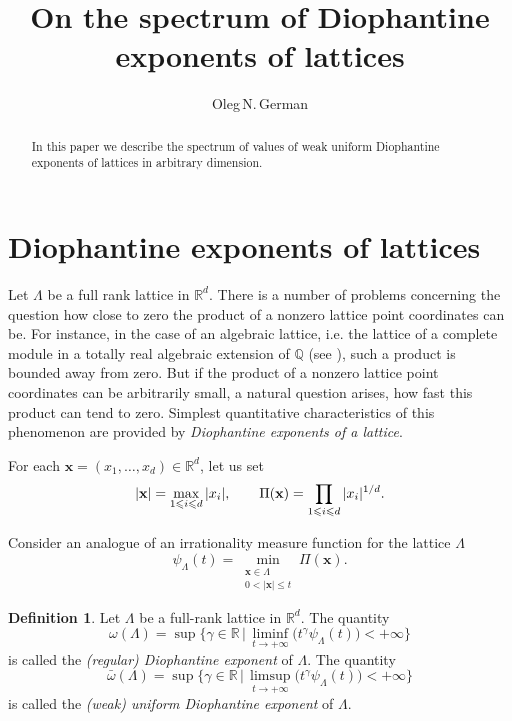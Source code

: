 \documentclass[a4paper,12pt]{article}
\title{On the spectrum of Diophantine exponents of lattices}
\author{Oleg\,N.\,German}
\date{}
\theoremstyle{definition}
\newtheorem{definition}{Definition}
\theoremstyle{remark}
\theoremstyle{plain}
\renewcommand{\vec}[1]{\mathbf{#1}}
\renewcommand{\leq}{\leqslant}
\newcommand{\R}{\mathbb{R}}
\newcommand{\Q}{\mathbb{Q}}
\newcommand{\La}{\Lambda}
\begin{document}
\maketitle

\begin{abstract}
  In this paper we describe the spectrum of values of weak uniform Diophantine exponents of lattices in arbitrary dimension.
\end{abstract}


\section{Diophantine exponents of lattices}


Let $\La$ be a full rank lattice in $\R^d$. There is a number of problems concerning the question how close to zero the product of a nonzero lattice point coordinates can be. For instance, in the case of an algebraic lattice, i.e. the lattice of a complete module in a totally real algebraic extension of $\Q$ (see \cite{borevich_shafarevich}), such a product is bounded away from zero. But if the product of a nonzero lattice point coordinates can be arbitrarily small, a natural question arises, how fast this product can tend to zero. Simplest quantitative characteristics of this phenomenon are provided by \emph{Diophantine exponents of a lattice}.

For each $\vec x=(x_1,\ldots,x_d)\in\R^d$, let us set
\[
  |\vec x|=\max_{1\leq i\leq d}|x_i|,
  \qquad
  \Pi(\vec x)=\prod_{\begin{subarray}{c}1\leq i\leq d\end{subarray}}|x_i|^{1/d}.
\]

Consider an analogue of an irrationality measure function for the lattice $\La$
\[
  \psi_\La(t)=\min_{\substack{ \vec x\in\La \\ 0<|\vec x|\leq t}}\Pi(\vec x).
\]

\begin{definition} \label{def:lattice_exponents_liminf_limsup}
  Let $\La$ be a full-rank lattice in $\R^d$. The quantity
  \[
    \omega(\La)=\sup\Big\{ \gamma\in\R \,\Big|\, \liminf_{t\to+\infty}\big(t^\gamma\psi_\La(t)\big)<+\infty \Big\}
  \]
  is called the \emph{(regular) Diophantine exponent} of $\La$.
  The quantity
  \[
    \bar\omega(\La)=\sup\Big\{ \gamma\in\R \,\Big|\, \limsup_{t\to+\infty}\big(t^\gamma\psi_\La(t)\big)<+\infty \Big\}
  \]
  is called the \emph{(weak) uniform Diophantine exponent} of $\La$.
\end{definition}
\end{document}
